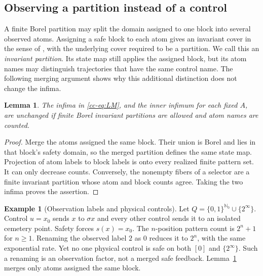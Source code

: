\documentclass[11pt,reqno]{amsart}
\numberwithin{equation}{section}
\newtheorem{lemma}[theorem]{Lemma}
\theoremstyle{definition}
\newtheorem{example}[theorem]{Example}
\theoremstyle{definition}
\newcommand{\Nzero}{\mathbb N_0}
\begin{document}
\subsection{Observing a partition instead of a control}
A finite Borel partition may split the domain assigned to one block
into several observed atoms. Assigning a safe block to each atom gives
an invariant cover in the sense of \cite[Definition~2.8]{Kawan2013},
with the underlying cover required to be a partition. We call this an
\emph{invariant partition}. Its state map still applies the assigned
block, but its atom names may distinguish trajectories that have the
same control name. The following merging argument shows why this
additional distinction does not change the infima.

\begin{lemma}\label{cc-lem:merge}
The infima in \eqref{cc-eq:LM}, and the inner infimum for each fixed
$A$, are unchanged if finite Borel invariant partitions are allowed
and atom names are counted.
\end{lemma}
\begin{proof}
Merge the atoms assigned the same block. Their union is Borel and
lies in that block's safety domain, so the merged partition defines
the same state map. Projection of atom labels to block labels is onto
every realized finite pattern set. It can only decrease counts.
Conversely, the nonempty fibers of a selector are a finite invariant
partition whose atom and block counts agree. Taking the two infima
proves the assertion.
\end{proof}

\begin{example}[Observation labels and physical controls]\label{ex:physical-merge}
Let $Q=\{0,1\}^{\Nzero}\cup\{2^\infty\}$. Control $u=x_0$
sends $x$ to $\sigma x$ and every other control sends it to an
isolated cemetery point. Safety forces $s(x)=x_0$. The $n$-position
pattern count is $2^n+1$ for $n\ge1$. Renaming the observed label $2$ as $0$
reduces it to $2^n$, with the same exponential rate. Yet no one
physical control is safe on both $[0]$ and $\{2^\infty\}$.
Such a renaming is an observation factor, not a merged safe feedback.
Lemma~\ref{cc-lem:merge} merges only atoms assigned the same block.
\end{example}
\end{document}
